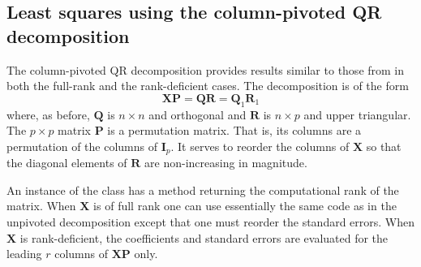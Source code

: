 \documentclass[shortnames,article]{jss}
\begin{document}

\subsection{Least squares using the column-pivoted QR decomposition}
\label{sec:colPivQR}

The column-pivoted QR decomposition provides results similar to those
from  in both the full-rank and the rank-deficient cases.
The decomposition is of the form
\begin{displaymath}
  \bm X\bm P=\bm Q\bm R=\bm Q_1\bm R_1
\end{displaymath}
where, as before, $\bm Q$ is $n\times n$ and orthogonal and $\bm R$ is
$n\times p$ and upper triangular.  The $p\times p$ matrix $\bm P$ is a
permutation matrix.  That is, its columns are a permutation of the
columns of $\bm I_p$.  It serves to reorder the columns of $\bm X$ so
that the diagonal elements of $\bm R$ are non-increasing in magnitude.

An instance of the class  has a
 method returning the computational rank of the matrix.
When $\bm X$ is of full rank one can use essentially the same code as
in the unpivoted decomposition except that one must reorder the
standard errors.  When $\bm X$ is rank-deficient, the
coefficients and standard errors are evaluated for the leading $r$ columns of $\bm
X\bm P$ only.
\end{document}
